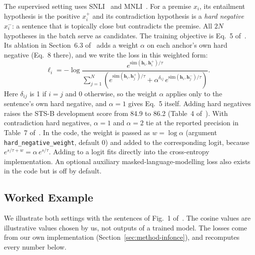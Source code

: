 The supervised setting uses SNLI~\cite{bowman-etal-2015-large} and
MNLI~\cite{williams-etal-2018-broad}. For a premise $x_i$, its entailment
hypothesis is the positive $x_i^+$ and its contradiction hypothesis is a
\emph{hard negative} $x_i^-$: a sentence that is topically close but
contradicts the premise. All $2N$ hypotheses in the batch serve as candidates.
The training objective is Eq.~5 of~\cite{gao-etal-2021-simcse}. Its ablation
in Section~6.3 of~\cite{gao-etal-2021-simcse} adds a weight $\alpha$ on each
anchor's own hard negative (Eq.~8 there), and we write the loss in this
weighted form:
\begin{equation}
\ell_i = -\log
  \frac{e^{\mathrm{sim}(\mathbf{h}_i,\mathbf{h}_i^+)/\tau}}
       {\sum_{j=1}^{N}\left( e^{\mathrm{sim}(\mathbf{h}_i,\mathbf{h}_j^+)/\tau}
        + \alpha^{\delta_{ij}}\, e^{\mathrm{sim}(\mathbf{h}_i,\mathbf{h}_j^-)/\tau}\right)}.
\label{eq:sup}
\end{equation}
Here $\delta_{ij}$ is 1 if $i=j$ and 0 otherwise, so the weight $\alpha$
applies only to the sentence's own hard negative, and
$\alpha=1$ gives Eq.~5 itself. Adding hard negatives raises the STS-B
development score from 84.9 to 86.2 (Table~4 of~\cite{gao-etal-2021-simcse}).
With contradiction hard negatives, $\alpha=1$ and $\alpha=2$ tie at the
reported precision in Table~7 of~\cite{gao-etal-2021-simcse}. In the code, the weight is passed as
$w=\log\alpha$ (argument \texttt{hard\_negative\_weight}, default $0$) and
added to the corresponding logit, because
$e^{s/\tau+w}=\alpha\,e^{s/\tau}$. Adding to a logit fits directly into the
cross-entropy implementation. An optional auxiliary masked-language-modelling
loss also exists in the code but is off by default.

\subsection{Worked Example}
\label{sec:method-example}

We illustrate both settings with the sentences of Fig.~1
of~\cite{gao-etal-2021-simcse}. The cosine values are illustrative values
chosen by us, not outputs of a trained model. The losses come from our own
implementation (Section~\ref{sec:method-infonce}), and
 recomputes every number below.


